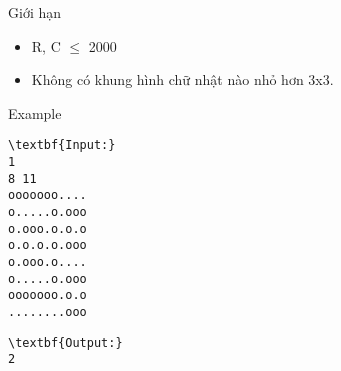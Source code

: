 Giới hạn
\begin{itemize}
	\item R, C  $\le$  2000
	\item Không có khung hình chữ nhật nào nhỏ hơn 3x3.
\end{itemize}
Example
\begin{verbatim}
\textbf{Input:}
1
8 11
ooooooo....
o.....o.ooo
o.ooo.o.o.o
o.o.o.o.ooo
o.ooo.o....
o.....o.ooo
ooooooo.o.o
........ooo\end{verbatim}
\begin{verbatim}
\textbf{Output:}
2\end{verbatim}